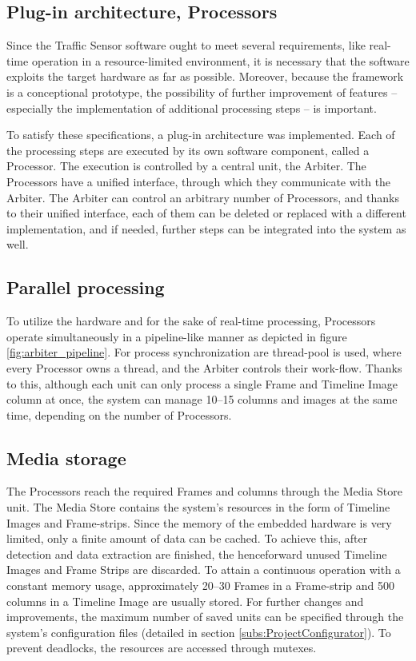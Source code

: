 \subsection{Plug-in architecture, Processors}
Since the Traffic Sensor software ought to meet several requirements, like real-time operation in a resource-limited environment, it is necessary that the software exploits the target hardware as far as possible.
Moreover, because the framework is a conceptional prototype, the possibility of further improvement of features -- especially the implementation of additional processing steps -- is important.

To satisfy these specifications, a plug-in architecture was implemented.
Each of the processing steps are executed by its own software component, called a Processor.
The execution is controlled by a central unit, the Arbiter.
The Processors have a unified interface, through which they communicate with the Arbiter.
The Arbiter can control an arbitrary number of Processors, and thanks to their unified interface, each of them can be deleted or replaced with a different implementation, and if needed, further steps can be integrated into the system as well.

\subsection{Parallel processing}
To utilize the hardware and for the sake of real-time processing, Processors operate simultaneously in a pipeline-like manner as depicted in figure \ref{fig:arbiter_pipeline}.
For process synchronization are thread-pool is used, where every Processor owns a thread, and the Arbiter controls their work-flow.
Thanks to this, although each unit can only process a single Frame and Timeline Image column at once, the system can manage 10--15 columns and images at the same time, depending on the number of Processors.

\subsection{Media storage}
The Processors reach the required Frames and columns through the Media Store unit.
The Media Store contains the system's resources in the form of Timeline Images and Frame-strips.
Since the memory of the embedded hardware is very limited, only a finite amount of data can be cached.
To achieve this, after detection and data extraction are finished, the henceforward unused Timeline Images and Frame Strips are discarded.
To attain a continuous operation with a constant memory usage, approximately 20--30 Frames in a Frame-strip and 500 columns in a Timeline Image are usually stored.
For further changes and improvements, the maximum number of saved units can be specified through the system's configuration files (detailed in section \ref{subs:ProjectConfigurator}).
To prevent deadlocks, the resources are accessed through mutexes.

